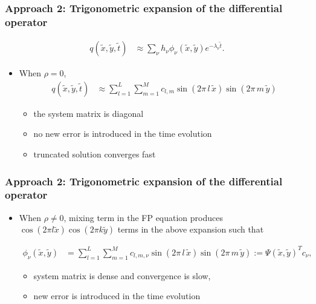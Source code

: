 \documentclass{beamer}
\begin{document}
\begin{frame}
  \frametitle{Approach 2: Trigonometric expansion of the differential operator}

  \begin{align*}
    q(\tilde{x},\tilde{y},\tilde{t}) &\approx  \sum_\nu h_\nu \phi_\nu (\tilde{x}, \tilde{y}) e^{-\lambda_\nu \tilde{t}}.
  \end{align*}
  
  \begin{itemize}
  \item When $\rho = 0$,
    \begin{align*}
      q(\tilde{x},\tilde{y},\tilde{t}) &\approx \sum_{l=1}^L \sum_{m=1}^M c_{l,m}
                                         \sin\left(2\pi\, l\, \tilde{x} \right) \sin\left(2\pi\, m\, \tilde{y} \right)
    \end{align*}

    \begin{itemize}
    \item the system matrix is diagonal
    \item no new error is introduced in the time evolution
    \item truncated solution converges fast
    \end{itemize}
  \end{itemize}
\end{frame}

\begin{frame}
  \frametitle{Approach 2: Trigonometric expansion of the differential operator}
  \begin{itemize}
    
  \item When $\rho \neq 0$, mixing term in the FP equation produces
    $\cos(2\pi l \tilde{x})\cos(2\pi k \tilde{y})$ terms in the above
    expansion such that
    
    \begin{align*}
      \phi_\nu(\tilde{x},\tilde{y}) &= \sum_{l=1}^L \sum_{m=1}^M c_{l,m, \nu}
                                      \sin\left(2\pi\, l\, \tilde{x} \right) \sin\left(2\pi\, m\, \tilde{y} \right) := \Psi(\tilde{x},\tilde{y})^T c_\nu,
    \end{align*}
    
    \begin{itemize}
    \item system matrix is dense and convergence is slow,
    \item new error is introduced in the time evolution
    \end{itemize}
    
  \end{itemize}
\end{frame}
\end{document}

